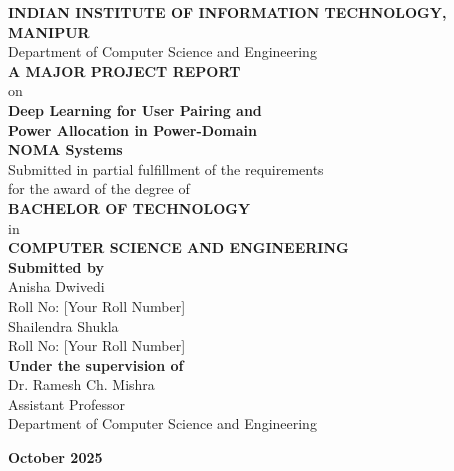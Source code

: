 \begin{titlepage}
    \centering
    
    \vspace*{1cm}
    
    
    {\Large\bfseries INDIAN INSTITUTE OF INFORMATION TECHNOLOGY, MANIPUR}\\[0.5cm]
    {\large Department of Computer Science and Engineering}\\[2cm]
    
    {\huge\bfseries A MAJOR PROJECT REPORT}\\[0.5cm]
    {\LARGE on}\\[1cm]
    
    {\Huge\bfseries Deep Learning for User Pairing and \\[0.3cm] Power Allocation in Power-Domain \\[0.3cm] NOMA Systems}\\[2cm]
    
    {\Large Submitted in partial fulfillment of the requirements\\[0.2cm]
    for the award of the degree of}\\[0.5cm]
    
    {\Large\bfseries BACHELOR OF TECHNOLOGY}\\[0.2cm]
    {\Large in}\\[0.2cm]
    {\Large\bfseries COMPUTER SCIENCE AND ENGINEERING}\\[2cm]
    
    {\large\bfseries Submitted by}\\[0.5cm]
    {\Large Anisha Dwivedi}\\[0.2cm]
    {\large Roll No: [Your Roll Number]}\\[0.2cm]
    {\Large Shailendra Shukla}\\[0.2cm]
    {\large Roll No: [Your Roll Number]}\\[2cm]
    
    {\large\bfseries Under the supervision of}\\[0.5cm]
    {\Large Dr. Ramesh Ch. Mishra}\\[0.2cm]
    {\large Assistant Professor}\\[0.2cm]
    {\large Department of Computer Science and Engineering}\\[2cm]
    
    \vfill
    
    {\large\bfseries October 2025}
    
\end{titlepage}
\newpage

